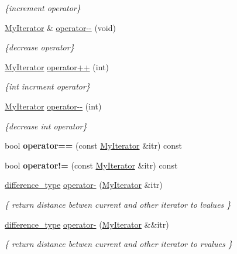 \begin{DoxyCompactItemize}
\begin{DoxyCompactList}\small\item\em \{increment operator\} \end{DoxyCompactList}\item 
\hyperlink{classMyIterator}{My\+Iterator} \& \hyperlink{classMyIterator_ae4acfd6eb2cf90596b33b1874dd3cf5f}{operator-\/-\/} (void)
\begin{DoxyCompactList}\small\item\em \{decrease operator\} \end{DoxyCompactList}\item 
\hyperlink{classMyIterator}{My\+Iterator} \hyperlink{classMyIterator_a84b1fec0b90ea0ad1727a52e33f64918}{operator++} (int)
\begin{DoxyCompactList}\small\item\em \{int incrment operator\} \end{DoxyCompactList}\item 
\hyperlink{classMyIterator}{My\+Iterator} \hyperlink{classMyIterator_ac976eedaee9a65a69133d7bd3306efab}{operator-\/-\/} (int)
\begin{DoxyCompactList}\small\item\em \{decrease int operator\} \end{DoxyCompactList}\item 
\mbox{\label{classMyIterator_ae4441cd04af8111ccb2b9844c0031915}} 
bool {\bfseries operator==} (const \hyperlink{classMyIterator}{My\+Iterator} \&itr) const
\item 
\mbox{\label{classMyIterator_a5328706bb5c5e42f766683079470f77d}} 
bool {\bfseries operator!=} (const \hyperlink{classMyIterator}{My\+Iterator} \&itr) const
\item 
\hyperlink{classMyIterator_ad6844a285132dae3746eab56209a19df}{difference\+\_\+type} \hyperlink{classMyIterator_ae0a5d53a39a4659af9a3fcc53bc4b9fa}{operator-\/} (\hyperlink{classMyIterator}{My\+Iterator} \&itr)
\begin{DoxyCompactList}\small\item\em \{ return distance betwen current and other iterator to lvalues \} \end{DoxyCompactList}\item 
\hyperlink{classMyIterator_ad6844a285132dae3746eab56209a19df}{difference\+\_\+type} \hyperlink{classMyIterator_acd9e090badecfce5e154b55a581b9bae}{operator-\/} (\hyperlink{classMyIterator}{My\+Iterator} \&\&itr)
\begin{DoxyCompactList}\small\item\em \{ return distance betwen current and other iterator to rvalues \} \end{DoxyCompactList}\end{DoxyCompactItemize}
